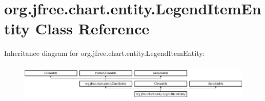 \hypertarget{classorg_1_1jfree_1_1chart_1_1entity_1_1_legend_item_entity}{}\section{org.\+jfree.\+chart.\+entity.\+Legend\+Item\+Entity Class Reference}
\label{classorg_1_1jfree_1_1chart_1_1entity_1_1_legend_item_entity}
Inheritance diagram for org.\+jfree.\+chart.\+entity.\+Legend\+Item\+Entity\+:\begin{figure}[H]
\begin{center}
\leavevmode
\includegraphics[height=1.787234cm]{classorg_1_1jfree_1_1chart_1_1entity_1_1_legend_item_entity}
\end{center}
\end{figure}
